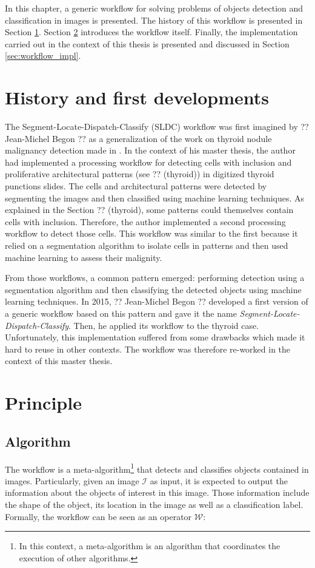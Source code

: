 In this chapter, a generic workflow for solving problems of objects detection and classification in images is presented. The history of this workflow is presented in Section \ref{sec:history_first_dev}. Section \ref{sec:workflow_principle} introduces the workflow itself. Finally, the implementation carried out in the context of this thesis is presented and discussed in Section \ref{sec:workflow_impl}.

\section{History and first developments}
\label{sec:history_first_dev}
The Segment-Locate-Dispatch-Classify (SLDC) workflow was first imagined by ?? Jean-Michel Begon ?? as a generalization of the work on thyroid nodule malignancy detection made in \cite{adeblire2013}. In the context of his master thesis, the author had implemented a processing workflow for detecting cells with inclusion and proliferative architectural patterns (see ?? (thyroid)) in digitized thyroid punctions slides. The cells and architectural patterns were detected by segmenting the images and then classified using machine learning techniques. As explained in the Section ?? (thyroid), some patterns could themselves contain cells with inclusion. Therefore, the author implemented a second processing workflow to detect those cells. This workflow was similar to the first because it relied on a segmentation algorithm to isolate cells in patterns and then used machine learning to assess their malignity. 

From those workflows, a common pattern emerged: performing detection using a segmentation algorithm and then classifying the detected objects using machine learning techniques. In 2015, ?? Jean-Michel Begon ?? developed a first version of a generic workflow based on this pattern and gave it the name \textit{Segment-Locate-Dispatch-Classify}. Then, he applied its workflow to the thyroid case. Unfortunately, this implementation suffered from some drawbacks which made it hard to reuse in other contexts. The workflow was therefore re-worked in the context of this master thesis.

\section{Principle}
\label{sec:workflow_principle}

\subsection{Algorithm}
\label{ssec:workflow_algo}
The workflow is a meta-algorithm\footnote{In this context, a meta-algorithm is an algorithm that coordinates the execution of other algorithms.} that detects and classifies objects contained in images. Particularly, given an image $\mathcal{I}$ as input, it is expected to output the information about the objects of interest in this image. Those information include the shape of the object, its location in the image as well as a classification label. Formally, the workflow can be seen as an operator $\mathcal{W}$:

